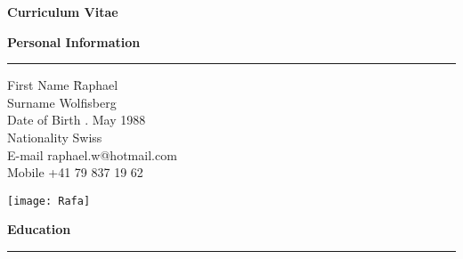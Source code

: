 



\graphicspath{{./Pictures/}}


\newpage
\pagestyle{plain}
\vspace{-9cm}

\huge
\textbf{Curriculum Vitae}

\bigskip
\bigskip
\bigskip
\bigskip
\large
\textbf{Personal Information}
\noindent\rule[3mm]{\linewidth}{1pt}

\normalsize
\vspace{-0.5cm}
\begin{tabbing}
First Name \hspace*{2.4cm} \= Raphael \\
Surname \> Wolfisberg \\
Date of Birth . May 1988 \\
Nationality \> Swiss \\
\medskip
E-mail \> raphael.w@hotmail.com \\
Mobile \> +41 79 837 19 62 
\end{tabbing}

\begin{addmargin}{0.03\textwidth}
\vspace{-4.4cm}
\begin{flushright}
\texttt{[image: Rafa]} \\[1cm]
\end{flushright}
\end{addmargin}


\vspace{-0.5cm}
\large
\textbf{Education}
\noindent\rule[3mm]{\linewidth}{1pt}

